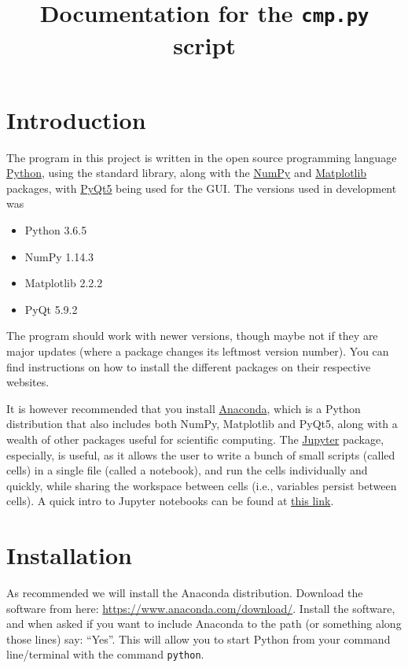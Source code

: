 \documentclass[a4paper,11pt]{article}
\title{Documentation for the \texorpdfstring{\texttt{cmp.py}}{cmp.py} script}
\date{}
\numberwithin{equation}{section}
\begin{document}
	\maketitle
	
	\section{Introduction}
	The program in this project is written in the open source programming language \href{www.python.org}{Python}, using the standard library, along with the \href{www.numpy.org}{NumPy} and \href{www.matplotlib.org}{Matplotlib} packages, with \href{www.pypi.org/project/PyQt5/}{PyQt5} being used for the GUI. The versions used in development was
	\begin{itemize}
		\item Python 3.6.5
		\item NumPy 1.14.3
		\item Matplotlib 2.2.2
		\item PyQt 5.9.2
	\end{itemize}
	The program should work with newer versions, though maybe not if they are major updates (where a package changes its leftmost version number). You can find instructions on how to install the different packages on their respective websites.
	
	It is however recommended that you install \href{https://www.anaconda.com/}{Anaconda}, which is a Python distribution that also includes both NumPy, Matplotlib and PyQt5, along with a wealth of other packages useful for scientific computing. The \href{http://jupyter.org/}{Jupyter} package, especially, is useful, as it allows the user to write a bunch of small scripts (called cells) in a single file (called a notebook), and run the cells individually and quickly, while sharing the workspace between cells (i.e., variables persist between cells). A quick intro to Jupyter notebooks can be found at \href{http://nbviewer.jupyter.org/github/jupyter/notebook/blob/master/docs/source/examples/Notebook/Notebook Basics.ipynb}{this link}.
	
	\section{Installation}
	As recommended we will install the Anaconda distribution. Download the software from here: \url{https://www.anaconda.com/download/}. Install the software, and when asked if you want to include Anaconda to the path (or something along those lines) say: ``Yes''. This will allow you to start Python from your command line/terminal with the command \texttt{python}.
	
\end{document}
